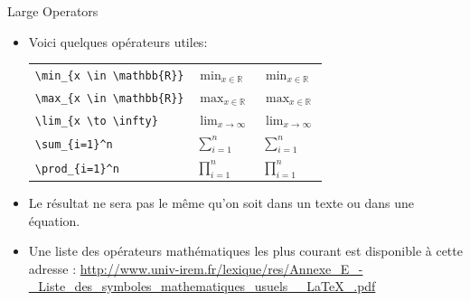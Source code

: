\begin{frame}[fragile]{Large Operators}
  \begin{itemize}
    \item Voici quelques opérateurs utiles:
      \begin{center}
          \begin{tabular}{lll}
          \lstinline|\min_{x \in \mathbb{R}}| & $\min_{x \in \mathbb{R}}$ & $\displaystyle\min_{x \in \mathbb{R}}$ \\
          \lstinline|\max_{x \in \mathbb{R}}| & $\max_{x \in \mathbb{R}}$ & $\displaystyle\max_{x \in \mathbb{R}}$ \\
          \lstinline|\lim_{x \to \infty}| & $\lim_{x \to \infty}$ & $\displaystyle\lim_{x \to \infty}$ \\
          \lstinline|\sum_{i=1}^n| & $\sum_{i=1}^n$ & $\displaystyle\sum_{i=1}^n$ \\
          \lstinline|\prod_{i=1}^n| & $\prod_{i=1}^n$ & $\displaystyle\prod_{i=1}^n$
          \end{tabular}
      \end{center}
    \item Le résultat ne sera pas le même qu'on soit dans un texte ou dans une équation.
    \item Une liste des opérateurs mathématiques les plus courant est disponible à cette adresse : \url{http://www.univ-irem.fr/lexique/res/Annexe_E_-_Liste_des_symboles_mathematiques_usuels__LaTeX_.pdf}
  \end{itemize}
\end{frame}

